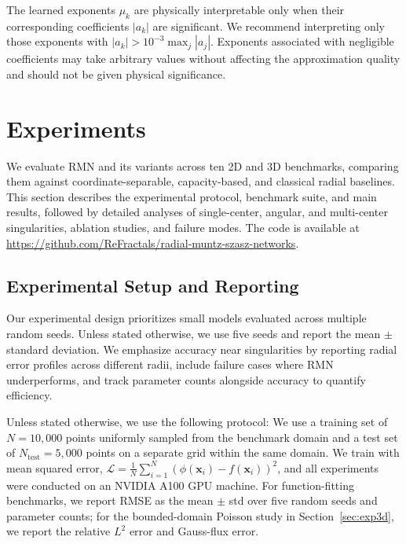 \documentclass[twoside,11pt]{article}
\newcommand{\bx}{\bm{x}}
\begin{document}
\begin{remark}
	\label{rem:identifiability}
	The learned exponents $\mu_k$ are physically interpretable only when their corresponding coefficients $|a_k|$ are significant. We recommend interpreting only those exponents with $|a_k| > 10^{-3} \max_j |a_j|$. Exponents associated with negligible coefficients may take arbitrary values without affecting the approximation quality and should not be given physical significance.
\end{remark}

\section{Experiments}
\label{sec:experiments}

We evaluate RMN and its variants across ten 2D and 3D benchmarks, comparing them against coordinate-separable, capacity-based, and classical radial baselines. This section describes the experimental protocol, benchmark suite, and main results, followed by detailed analyses of single-center, angular, and multi-center singularities, ablation studies, and failure modes. The code is available at \url{https://github.com/ReFractals/radial-muntz-szasz-networks}.

\subsection{Experimental Setup and Reporting}
\label{subsec:training_protocol}

Our experimental design prioritizes small models evaluated across multiple random seeds. Unless stated otherwise, we use five seeds and report the mean $\pm$ standard deviation. We emphasize accuracy near singularities by reporting radial error profiles across different radii, include failure cases where RMN underperforms, and track parameter counts alongside accuracy to quantify efficiency.

Unless stated otherwise, we use the following protocol: We use a training set of $N = 10{,}000$ points uniformly sampled from the benchmark domain and a test set of $N_{\text{test}} = 5{,}000$ points on a separate grid within the same domain. We train with mean squared error, $\mathcal{L} = \frac{1}{N} \sum_{i=1}^N (\phi(\bx_i) - f(\bx_i))^2$, and all experiments were conducted on an NVIDIA A100 GPU machine. For function-fitting benchmarks, we report RMSE as the mean $\pm$ std over five random seeds and parameter counts; for the bounded-domain Poisson study in Section~\ref{sec:exp3d}, we report the relative $L^2$ error and Gauss-flux error.
\end{document}
